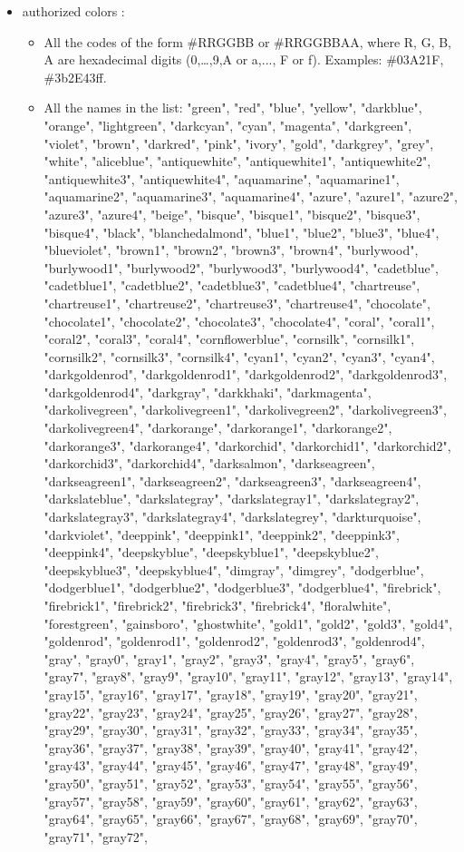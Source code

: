 \begin{itemize}
\item authorized colors :
  \begin{itemize}
  \item All the codes of the form \#RRGGBB or \#RRGGBBAA, where R, G, B, A are hexadecimal digits (0,\dots,9,A or a,..., F or f). Examples: \#03A21F, \#3b2E43ff.
  \item All the names in the list: "green", "red", "blue", "yellow", "darkblue", "orange", "lightgreen", "darkcyan", "cyan", "magenta", "darkgreen", "violet", "brown", "darkred", "pink", "ivory", "gold", "darkgrey", "grey", "white", "aliceblue", "antiquewhite", "antiquewhite1", "antiquewhite2", "antiquewhite3", "antiquewhite4", "aquamarine", "aquamarine1", "aquamarine2", "aquamarine3", "aquamarine4", "azure", "azure1", "azure2", "azure3", "azure4", "beige", "bisque", "bisque1", "bisque2", "bisque3", "bisque4", "black", "blanchedalmond", "blue1", "blue2", "blue3", "blue4", "blueviolet", "brown1", "brown2", "brown3", "brown4", "burlywood", "burlywood1", "burlywood2", "burlywood3", "burlywood4", "cadetblue", "cadetblue1", "cadetblue2", "cadetblue3", "cadetblue4", "chartreuse", "chartreuse1", "chartreuse2", "chartreuse3", "chartreuse4", "chocolate", "chocolate1", "chocolate2", "chocolate3", "chocolate4", "coral", "coral1", "coral2", "coral3", "coral4", "cornflowerblue", "cornsilk", "cornsilk1", "cornsilk2", "cornsilk3", "cornsilk4", "cyan1", "cyan2", "cyan3", "cyan4", "darkgoldenrod", "darkgoldenrod1", "darkgoldenrod2", "darkgoldenrod3", "darkgoldenrod4", "darkgray", "darkkhaki", "darkmagenta", "darkolivegreen", "darkolivegreen1", "darkolivegreen2", "darkolivegreen3", "darkolivegreen4", "darkorange", "darkorange1", "darkorange2", "darkorange3", "darkorange4", "darkorchid", "darkorchid1", "darkorchid2", "darkorchid3", "darkorchid4", "darksalmon", "darkseagreen", "darkseagreen1", "darkseagreen2", "darkseagreen3", "darkseagreen4", "darkslateblue", "darkslategray", "darkslategray1", "darkslategray2", "darkslategray3", "darkslategray4", "darkslategrey", "darkturquoise", "darkviolet", "deeppink", "deeppink1", "deeppink2", "deeppink3", "deeppink4", "deepskyblue", "deepskyblue1", "deepskyblue2", "deepskyblue3", "deepskyblue4", "dimgray", "dimgrey", "dodgerblue", "dodgerblue1", "dodgerblue2", "dodgerblue3", "dodgerblue4", "firebrick", "firebrick1", "firebrick2", "firebrick3", "firebrick4", "floralwhite", "forestgreen", "gainsboro", "ghostwhite", "gold1", "gold2", "gold3", "gold4", "goldenrod", "goldenrod1", "goldenrod2", "goldenrod3", "goldenrod4", "gray", "gray0", "gray1", "gray2", "gray3", "gray4", "gray5", "gray6", "gray7", "gray8", "gray9", "gray10", "gray11", "gray12", "gray13", "gray14", "gray15", "gray16", "gray17", "gray18", "gray19", "gray20", "gray21", "gray22", "gray23", "gray24", "gray25", "gray26", "gray27", "gray28", "gray29", "gray30", "gray31", "gray32", "gray33", "gray34", "gray35", "gray36", "gray37", "gray38", "gray39", "gray40", "gray41", "gray42", "gray43", "gray44", "gray45", "gray46", "gray47", "gray48", "gray49", "gray50", "gray51", "gray52", "gray53", "gray54", "gray55", "gray56", "gray57", "gray58", "gray59", "gray60", "gray61", "gray62", "gray63", "gray64", "gray65", "gray66", "gray67", "gray68", "gray69", "gray70", "gray71", "gray72", 
\end{itemize}
\end{itemize}
